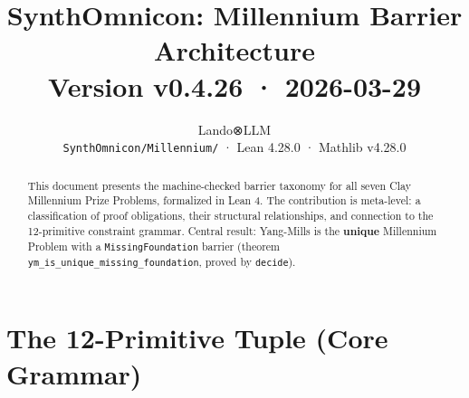 \documentclass[11pt,a4paper]{article}
\title{\textbf{\Large SynthOmnicon: Millennium Barrier Architecture}\\
\large Version v0.4.26 · 2026-03-29}
\author{Lando⊗LLM \\ \texttt{SynthOmnicon/Millennium/} · Lean 4.28.0 · Mathlib v4.28.0}
\date{}
\begin{document}
\maketitle

\begin{abstract}
\noindent This document presents the machine-checked barrier taxonomy for all seven Clay Millennium Prize Problems, formalized in Lean 4. The contribution is meta-level: a classification of proof obligations, their structural relationships, and connection to the 12-primitive constraint grammar. Central result: Yang-Mills is the \textbf{unique} Millennium Problem with a \texttt{MissingFoundation} barrier (theorem \texttt{ym\_is\_unique\_missing\_foundation}, proved by \texttt{decide}).
\end{abstract}

\tableofcontents
\newpage

\section{The 12-Primitive Tuple (Core Grammar)}
\end{document}
